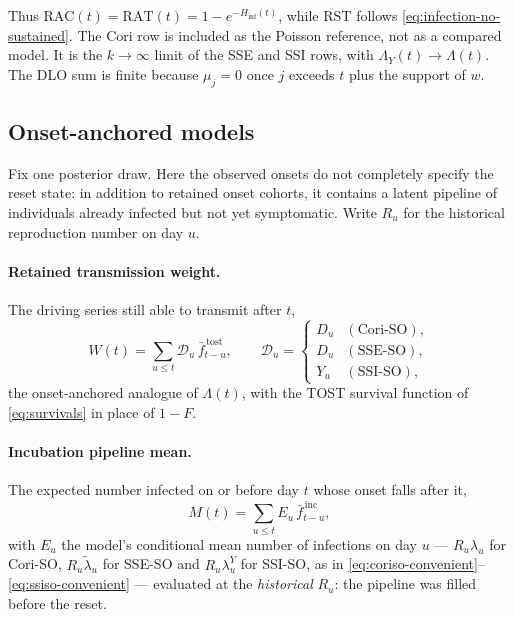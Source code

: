 \documentclass[11pt,a4paper]{article}
\theoremstyle{plain}
\theoremstyle{definition}
\newcommand{\stost}{\bar{f}^{\,\mathrm{tost}}}
\newcommand{\sinc}{\bar{f}^{\,\mathrm{inc}}}
\newcommand{\RAC}{\mathrm{RAC}}
\newcommand{\RAT}{\mathrm{RAT}}
\newcommand{\RST}{\mathrm{RST}}
\newcommand{\dlo}{DLO}
\newcommand{\sse}{SSE}
\newcommand{\ssi}{SSI}
\newcommand{\sseso}{SSE-SO}
\newcommand{\ssiso}{SSI-SO}
\newcommand{\cori}{Cori}
\newcommand{\coriso}{Cori-SO}
\begin{document}
\noindent
Thus $\RAC(t)=\RAT(t)=1-e^{-H_{\mathrm{inf}}(t)}$, while $\RST$ follows
\eqref{eq:infection-no-sustained}. The \cori{} row is included as the Poisson
reference, not as a compared model. It is the $k\to\infty$ limit of the \sse{} and \ssi{} rows,
with $\Lambda_Y(t)\to\Lambda(t)$. The \dlo{} sum is finite because $\mu_j=0$ once $j$ exceeds
$t$ plus the support of $w$.

\subsection{Onset-anchored models}
\label{sec:onset-risk}

Fix one posterior draw. Here the observed onsets do not completely specify the reset state: in
addition to retained onset cohorts, it contains a latent pipeline of individuals already infected
but not yet symptomatic. Write $R_u$ for the historical reproduction number on day $u$.

\paragraph{Retained transmission weight.} The driving series still able to transmit after $t$,
\begin{equation}
  W(t) = \sum_{u \le t} \mathcal{D}_u\, \stost_{t-u},
  \qquad
  \mathcal{D}_u =
  \begin{cases}
    D_u & (\text{\coriso}),\\
    D_u & (\text{\sseso}),\\
    Y_u & (\text{\ssiso}),
  \end{cases}
  \label{eq:retained-weight}
\end{equation}
the onset-anchored analogue of $\Lambda(t)$, with the TOST survival function of
\eqref{eq:survivals} in place of $1-F$.

\paragraph{Incubation pipeline mean.} The expected number infected on or before day $t$ whose
onset falls after it,
\begin{equation}
  M(t) = \sum_{u \le t} E_u\, \sinc_{t-u},
  \label{eq:pipeline}
\end{equation}
with $E_u$ the model's conditional mean number of infections on day $u$ --- $R_u\lambda_u$ for
\coriso{}, $R_u\tilde\lambda_u$ for \sseso{} and $R_u\lambda^{Y}_u$ for \ssiso{}, as in
\eqref{eq:coriso-convenient}--\eqref{eq:ssiso-convenient} ---
evaluated at the \emph{historical} $R_u$: the pipeline was filled before the reset.
\end{document}
